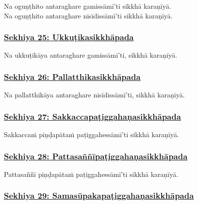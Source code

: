 Na oguṇṭhito antaraghare gamissāmī'ti sikkhā karaṇīyā.\\
Na oguṇṭhito antaraghare nisīdissāmī'ti sikkhā karaṇīyā.



\subsubsection*{\hyperref[training25]{Sekhiya 25: Ukkuṭikasikkhāpada}}
\label{sekh25}

Na ukkuṭikāya antaraghare gamissāmī'ti, sikkhā karaṇīyā.



\subsubsection*{\hyperref[training26]{Sekhiya 26: Pallatthikasikkhāpada}}
\label{sekh26}

Na pallatthikāya antaraghare nisīdissāmī'ti, sikkhā karaṇīyā.\makeatletter\hyperlink{endnote479-appendix}\makeatother \thinspace



\subsubsection*{\hyperref[training27]{Sekhiya 27: Sakkaccapaṭiggahaṇasikkhāpada}}
\label{sekh27}

Sakkaccaṁ piṇḍapātaṁ paṭiggahessāmī'ti sikkhā karaṇīyā.



\subsubsection*{\hyperref[training28]{Sekhiya 28: Pattasaññīpaṭiggahaṇasikkhāpada}}
\label{sekh28}

Pattasaññī piṇḍapātaṁ paṭiggahessāmī'ti sikkhā karaṇīyā.



\subsubsection*{\hyperref[training29]{Sekhiya 29: Samasūpakapaṭiggahaṇasikkhāpada}}
\label{sekh29}


